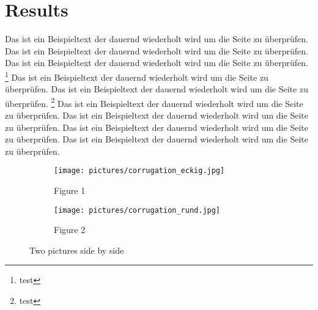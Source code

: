 \section{Results}
\label{cha:results}
Das ist ein Beispieltext der dauernd wiederholt wird um die Seite zu überprüfen.
Das ist ein Beispieltext der dauernd wiederholt wird um die Seite zu überprüfen.  Das ist ein Beispieltext der dauernd wiederholt wird um die Seite zu überprüfen. \footnote{test} Das ist ein Beispieltext der dauernd wiederholt wird um die Seite zu überprüfen. Das ist ein Beispieltext der dauernd wiederholt wird um die Seite zu überprüfen. \footnote{test} Das ist ein Beispieltext der dauernd wiederholt wird um die Seite zu überprüfen. Das ist ein Beispieltext der dauernd wiederholt wird um die Seite zu überprüfen. Das ist ein Beispieltext der dauernd wiederholt wird um die Seite zu überprüfen. Das ist ein Beispieltext der dauernd wiederholt wird um die Seite zu überprüfen. 
\begin{figure}[H]
	\centering
	\begin{subfigure}[b]{0.45\textwidth}
		\centering \texttt{[image: pictures/corrugation\_eckig.jpg]}
		\caption{Figure 1}
		\label{fig:bild1}
	\end{subfigure}
	\hfill
	\begin{subfigure}[b]{0.45\textwidth}
		\centering    \texttt{[image: pictures/corrugation\_rund.jpg]}
		\caption{Figure 2}
		\label{fig:bild2}
	\end{subfigure}
	\caption{Two pictures side by side}
	\label{fig:twofigures}
\end{figure}
